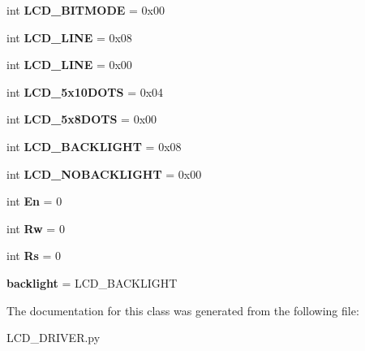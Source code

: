 \begin{DoxyCompactItemize}
\item 
\hypertarget{classdriver_1_1LCD__DRIVER_1_1LCD_afe367a2e77065624e93cbe1bcfe5a213}{}int {\bfseries L\+C\+D\+\_\+B\+I\+T\+M\+O\+D\+E} = 0x00\label{classdriver_1_1LCD__DRIVER_1_1LCD_afe367a2e77065624e93cbe1bcfe5a213}

\item 
\hypertarget{classdriver_1_1LCD__DRIVER_1_1LCD_adff821ac4bc8133e94dbc30a4a8cea3e}{}int {\bfseries L\+C\+D\+\_\+L\+I\+N\+E} = 0x08\label{classdriver_1_1LCD__DRIVER_1_1LCD_adff821ac4bc8133e94dbc30a4a8cea3e}

\item 
\hypertarget{classdriver_1_1LCD__DRIVER_1_1LCD_a7a6ac4fbef8a8b85dca204ea6f68563b}{}int {\bfseries L\+C\+D\+\_\+L\+I\+N\+E} = 0x00\label{classdriver_1_1LCD__DRIVER_1_1LCD_a7a6ac4fbef8a8b85dca204ea6f68563b}

\item 
\hypertarget{classdriver_1_1LCD__DRIVER_1_1LCD_abb958d3d77183e9d79dec256939bf6ce}{}int {\bfseries L\+C\+D\+\_\+5x10\+D\+O\+T\+S} = 0x04\label{classdriver_1_1LCD__DRIVER_1_1LCD_abb958d3d77183e9d79dec256939bf6ce}

\item 
\hypertarget{classdriver_1_1LCD__DRIVER_1_1LCD_a5ec59491f9f0ffcff843f4d942fe9b73}{}int {\bfseries L\+C\+D\+\_\+5x8\+D\+O\+T\+S} = 0x00\label{classdriver_1_1LCD__DRIVER_1_1LCD_a5ec59491f9f0ffcff843f4d942fe9b73}

\item 
\hypertarget{classdriver_1_1LCD__DRIVER_1_1LCD_ab561475ec42356be07b859bccc49e441}{}int {\bfseries L\+C\+D\+\_\+\+B\+A\+C\+K\+L\+I\+G\+H\+T} = 0x08\label{classdriver_1_1LCD__DRIVER_1_1LCD_ab561475ec42356be07b859bccc49e441}

\item 
\hypertarget{classdriver_1_1LCD__DRIVER_1_1LCD_a177f789e02e3cc5beb8c962b6f413101}{}int {\bfseries L\+C\+D\+\_\+\+N\+O\+B\+A\+C\+K\+L\+I\+G\+H\+T} = 0x00\label{classdriver_1_1LCD__DRIVER_1_1LCD_a177f789e02e3cc5beb8c962b6f413101}

\item 
\hypertarget{classdriver_1_1LCD__DRIVER_1_1LCD_a4ac70789c28a90ac717c080eb0ad44c5}{}int {\bfseries En} = 0\label{classdriver_1_1LCD__DRIVER_1_1LCD_a4ac70789c28a90ac717c080eb0ad44c5}

\item 
\hypertarget{classdriver_1_1LCD__DRIVER_1_1LCD_aa414dbce7b4b58751c5c08c8cf5bb406}{}int {\bfseries Rw} = 0\label{classdriver_1_1LCD__DRIVER_1_1LCD_aa414dbce7b4b58751c5c08c8cf5bb406}

\item 
\hypertarget{classdriver_1_1LCD__DRIVER_1_1LCD_a35d42fe004231a154653b30da370cbdc}{}int {\bfseries Rs} = 0\label{classdriver_1_1LCD__DRIVER_1_1LCD_a35d42fe004231a154653b30da370cbdc}

\item 
\hypertarget{classdriver_1_1LCD__DRIVER_1_1LCD_a15ab6095283680557c894c117a6b4fff}{}{\bfseries backlight} = L\+C\+D\+\_\+\+B\+A\+C\+K\+L\+I\+G\+H\+T\label{classdriver_1_1LCD__DRIVER_1_1LCD_a15ab6095283680557c894c117a6b4fff}

\end{DoxyCompactItemize}


The documentation for this class was generated from the following file\+:\begin{DoxyCompactItemize}
\item 
L\+C\+D\+\_\+\+D\+R\+I\+V\+E\+R.\+py\end{DoxyCompactItemize}
